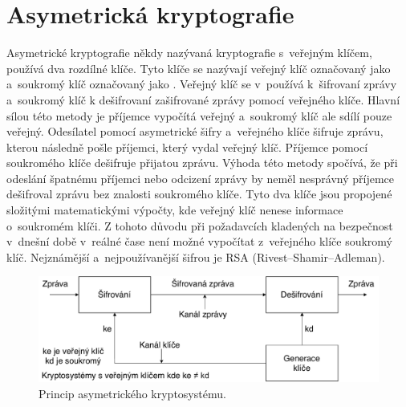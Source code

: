 \section{Asymetrická kryptografie}
Asymetrické kryptografie někdy nazývaná kryptografie s~veřejným klíčem, používá dva rozdílné klíče. Tyto klíče se nazývají veřejný klíč označovaný jako  a~soukromý klíč označovaný jako . Veřejný klíč se v~používá k~šifrovaní zprávy a~soukromý klíč k dešifrovaní zašifrované zprávy pomocí veřejného klíče. Hlavní sílou této metody je příjemce vypočítá veřejný a~soukromý klíč ale sdílí pouze veřejný. Odesílatel pomocí asymetrické šifry a~veřejného klíče šifruje zprávu, kterou následně pošle příjemci, který vydal veřejný klíč. Příjemce pomocí soukromého klíče dešifruje přijatou zprávu. Výhoda této metody spočívá, že při odeslání špatnému příjemci nebo odcizení zprávy by neměl nesprávný příjemce dešifroval zprávu bez znalosti soukromého klíče. Tyto dva klíče jsou propojené složitými matematickými výpočty, kde veřejný klíč nenese informace o~soukromém klíči. Z tohoto důvodu při požadavcích kladených na bezpečnost v~dnešní době v~reálné čase není možné vypočítat z~veřejného klíče soukromý klíč. Nejznámější a~nejpoužívanější šifrou je RSA
(Rivest–Shamir–Adleman).\cite{Nigel9780077099879ISBN}
\newpage
\begin{figure}[!h]
  \begin{center}
    \includegraphics[scale=0.5]{obrazky/AsymmetricCrutosystem.pdf}
  \end{center}
  \caption[Princip asymetrického kryptosystému]{Princip asymetrického kryptosystému.\footnotemark\cite{Mao0130669431ISBN}}
  \label{img:asymmetricCrypto}
\end{figure}
